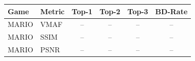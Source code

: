 \begin{tabular}{llcccc}
\toprule
Game & Metric & Top-1 & Top-2 & Top-3 & BD-Rate \\
\midrule
MARIO & VMAF & -- & -- & -- & -- \\
MARIO & SSIM & -- & -- & -- & -- \\
MARIO & PSNR & -- & -- & -- & -- \\
\bottomrule
\end{tabular}
